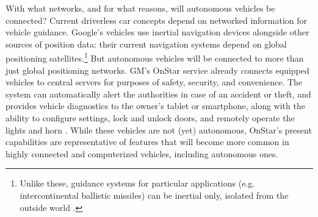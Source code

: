 With what networks, and for what reasons, will autonomous vehicles be
connected? Current driverless car concepts depend on networked
information for vehicle guidance.
Google's vehicles use inertial navigation devices \cite{knightFurther}
alongside other sources of position data: their current navigation systems
depend on global positioning satellites.\footnote{Unlike these,
guidance systems for particular applications (e.g. intercontinental ballistic
missiles) can be inertial only, isolated from the outside world
\cite{mackenzie}.} But autonomous
vehicles will be connected to more than just global positioning
networks. GM's OnStar service already connects equipped vehicles to central servers for
purposes of safety, security, and convenience. The system can
automatically alert the authorities in case of an accident 
or theft, and provides vehicle diagnostics to the owner's tablet
or smartphone, along with the ability to
configure settings, lock and 
unlock doors, and remotely operate the lights and horn \cite{onstar}.
While these vehicles are not (yet) autonomous, OnStar's present
capabilities are representative of features that will become more common in highly
connected and computerized vehicles, including autonomous ones.



